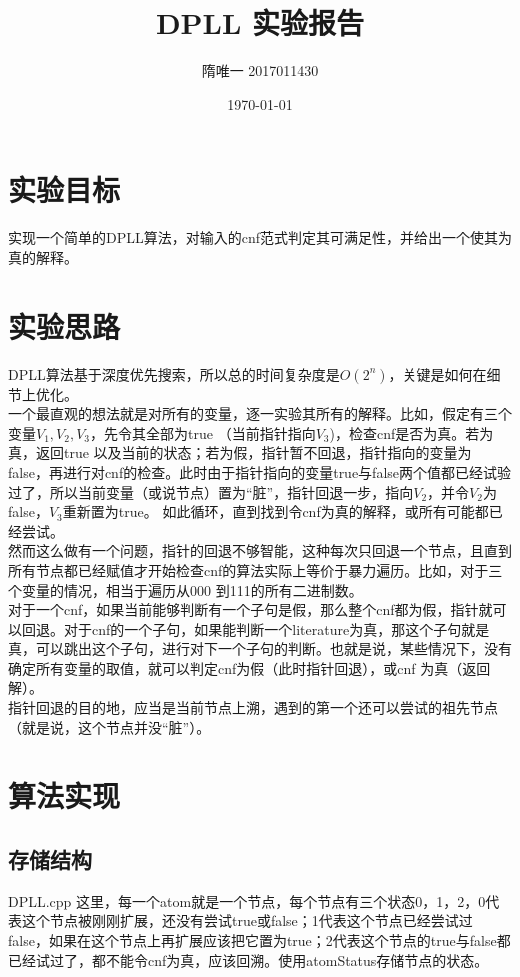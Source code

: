 \documentclass[UTF8]{article}
\begin{document}
\author{隋唯一 2017011430}

\title{DPLL 实验报告}
\date{\today}
\maketitle

\section{实验目标}
实现一个简单的DPLL算法，对输入的cnf范式判定其可满足性，并给出一个使其为真的解释。
\section{实验思路}
DPLL算法基于深度优先搜索，所以总的时间复杂度是$O({2^n})$，关键是如何在细节上优化。\\
一个最直观的想法就是对所有的变量，逐一实验其所有的解释。比如，假定有三个变量$V_{1},V_{2},V_{3}$，先令其全部为true （当前指针指向$V_{3}$)，检查cnf是否为真。若为真，返回true 以及当前的状态；若为假，指针暂不回退，指针指向的变量为false，再进行对cnf的检查。此时由于指针指向的变量true与false两个值都已经试验过了，所以当前变量（或说节点）置为“脏”，指针回退一步，指向$V_{2}$，并令$V_{2}$为false，$V_{3}$重新置为true。 如此循环，直到找到令cnf为真的解释，或所有可能都已经尝试。\\
然而这么做有一个问题，指针的回退不够智能，这种每次只回退一个节点，且直到所有节点都已经赋值才开始检查cnf的算法实际上等价于暴力遍历。比如，对于三个变量的情况，相当于遍历从000 到111的所有二进制数。\\
对于一个cnf，如果当前能够判断有一个子句是假，那么整个cnf都为假，指针就可以回退。对于cnf的一个子句，如果能判断一个literature为真，那这个子句就是真，可以跳出这个子句，进行对下一个子句的判断。也就是说，某些情况下，没有确定所有变量的取值，就可以判定cnf为假（此时指针回退），或cnf 为真（返回解）。\\
指针回退的目的地，应当是当前节点上溯，遇到的第一个还可以尝试的祖先节点（就是说，这个节点并没“脏”）。
\section{算法实现}
\subsection{存储结构}
{DPLL.cpp}
这里，每一个atom就是一个节点，每个节点有三个状态0，1，2，0代表这个节点被刚刚扩展，还没有尝试true或false；1代表这个节点已经尝试过false，如果在这个节点上再扩展应该把它置为true；2代表这个节点的true与false都已经试过了，都不能令cnf为真，应该回溯。使用atomStatus存储节点的状态。
\end{document}
